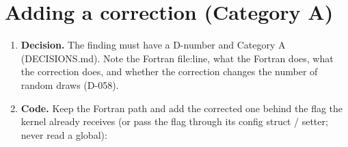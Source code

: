 \section{\texorpdfstring{Adding a correction (Category A)}{Adding a correction (Category A)}}\label{translation_report-05u5fcompat:53-adding-a-correction-category-a}
\begin{enumerate}
\item \textbf{Decision.} The finding must have a D-number and Category A (DECISIONS.md). Note the Fortran file:line, what the
Fortran does, what the correction does, and whether the correction changes the number of random draws (D-058).
\item \textbf{Code.} Keep the Fortran path and add the corrected one behind the flag the kernel already receives (or pass the
flag through its config struct / setter; never read a global):


\end{enumerate}
